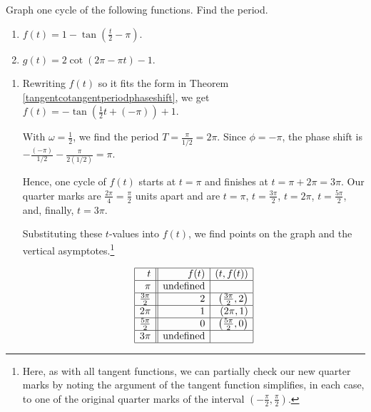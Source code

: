 \documentclass{ximera}
\begin{document}
\begin{example} \label{tancotgraphex} Graph one cycle of the following functions.  Find the period.

\begin{enumerate}

\item  $f(t) = 1 - \tan\left(\frac{t}{2} - \pi \right)$.

\item  $g(t) = 2\cot\left(2\pi - \pi t \right) - 1$.

\end{enumerate}

\begin{explanation}

\begin{enumerate}

\item Rewriting $f(t)$ so it fits the form in  Theorem \ref{tangentcotangentperiodphaseshift}, we get $f(t) = - \tan\left(\frac{1}{2} t  + (- \pi) \right) + 1$.   



With $\omega = \frac{1}{2}$, we find the period $T = \frac{\pi}{1/2} = 2 \pi$.  Since $\phi = -\pi$, the phase shift is $-\frac{(-\pi)}{1/2} - \frac{\pi}{2 (1/2)} = \pi$.



Hence, one cycle of $f(t)$ starts at $t=\pi$ and finishes at $t = \pi + 2\pi = 3\pi$.  Our quarter marks are $\frac{2\pi}{4} = \frac{\pi}{2}$ units apart and are $t  = \pi$, $t = \frac{3\pi}{2}$, $t = 2\pi$, $t  = \frac{5\pi}{2}$, and, finally, $t = 3\pi$.  



Substituting these $t$-values into $f(t)$, we find points on the graph and the vertical asymptotes.\footnote{Here, as with all tangent functions, we can partially check our new quarter marks by noting the argument of the tangent function simplifies, in each case,  to one of the original quarter marks of the interval $\left(-\frac{\pi}{2}, \frac{\pi}{2} \right)$.}


\[ \begin{array}{|r||r|r|} \hline
t & f(t) & (t,f(t))  \\ \hline
\pi  & \text{undefined} &   \\ \hline
\frac{3\pi}{2}  &  2 &  \left(\frac{3\pi}{2}, 2 \right) \\ \hline 
2 \pi & 1 &  (2\pi,1)  \\ \hline 
\frac{5\pi}{2}  & 0 &  \left(\frac{5\pi}{2}, 0 \right) \\ \hline 
3 \pi & \text{undefined} &   \\ \hline 
\end{array} \] 


\end{enumerate}
\end{explanation}
\end{example}
\end{document}
